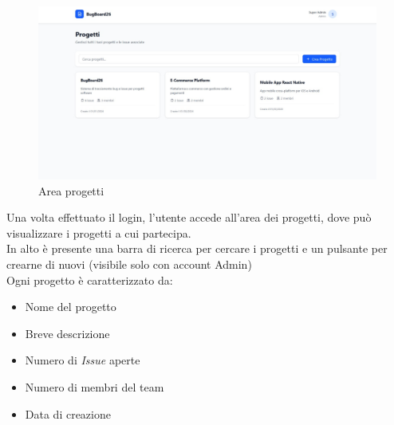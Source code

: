 \begin{figure}
	\centering
	\includegraphics[width=1\linewidth]{./Assets/Chapters/mkp2.jpg}
	\caption{Area progetti}
\end{figure}
Una volta effettuato il login, l'utente accede all'area dei progetti, dove può visualizzare i progetti a cui partecipa.\\
In alto è presente una barra di ricerca per cercare i progetti e un pulsante per crearne di nuovi (visibile solo con account Admin)\\
Ogni progetto è caratterizzato da:
\begin{itemize}
	\item Nome del progetto
	\item Breve descrizione
	\item Numero di \textit{Issue} aperte
	\item Numero di membri del team
	\item Data di creazione
	
\end{itemize}

